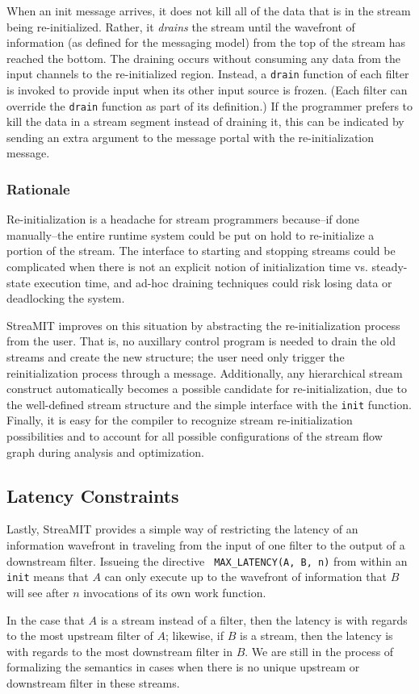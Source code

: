 When an init message arrives, it does not kill all of the data that is
in the stream being re-initialized.  Rather, it {\it drains} the
stream until the wavefront of information (as defined for the
messaging model) from the top of the stream has reached the bottom.
The draining occurs without consuming any data from the input channels
to the re-initialized region.  Instead, a {\tt drain} function of each
filter is invoked to provide input when its other input source is
frozen.  (Each filter can override the {\tt drain} function as part of
its definition.)  If the programmer prefers to kill the data in a
stream segment instead of draining it, this can be indicated by
sending an extra argument to the message portal with the
re-initialization message.

\subsubsection{Rationale}

Re-initialization is a headache for stream programmers because--if
done manually--the entire runtime system could be put on hold to
re-initialize a portion of the stream.  The interface to starting and
stopping streams could be complicated when there is not an explicit
notion of initialization time vs. steady-state execution time, and
ad-hoc draining techniques could risk losing data or deadlocking the
system.

StreaMIT improves on this situation by abstracting the
re-initialization process from the user.  That is, no auxillary
control program is needed to drain the old streams and create the new
structure; the user need only trigger the reinitialization process
through a message.  Additionally, any hierarchical stream construct
automatically becomes a possible candidate for re-initialization, due
to the well-defined stream structure and the simple interface with the
{\tt init} function.  Finally, it is easy for the compiler to
recognize stream re-initialization possibilities and to account for
all possible configurations of the stream flow graph during analysis
and optimization.

\subsection{Latency Constraints}

Lastly, StreaMIT provides a simple way of restricting the latency of
an information wavefront in traveling from the input of one filter to
the output of a downstream filter.  Issueing the directive {\tt
MAX\_LATENCY(A, B, n)} from within an {\tt init} means that $A$ can
only execute up to the wavefront of information that $B$ will see
after $n$ invocations of its own work function.

In the case that $A$ is a stream instead of a filter, then the latency
is with regards to the most upstream filter of $A$; likewise, if $B$
is a stream, then the latency is with regards to the most downstream
filter in $B$.  We are still in the process of formalizing the
semantics in cases when there is no unique upstream or downstream
filter in these streams.


